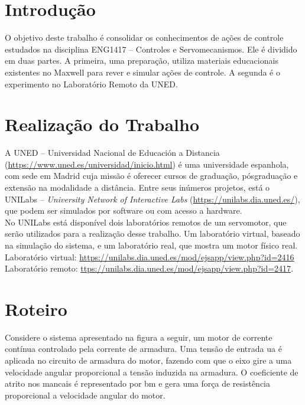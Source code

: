 \documentclass[a4paper, 12pt]{article}
\begin{document}


\newpage
\listoffigures

\pagebreak

\section{Introdução}
O objetivo deste trabalho é consolidar os conhecimentos de ações de controle estudados na disciplina ENG1417 – Controles e Servomecanismos. Ele é dividido em duas partes. A primeira, uma preparação, utiliza materiais educacionais existentes no Maxwell para rever e simular ações de controle. A segunda é o experimento no Laboratório Remoto da UNED.

\section{Realização do Trabalho}
A UNED – Universidad Nacional de Educación a Distancia (\url{https://www.uned.es/universidad/inicio.html}) é uma universidade espanhola, com sede em Madrid cuja missão é oferecer cursos de graduação, pósgraduação e extensão na modalidade a distância. Entre seus inúmeros projetos, está o UNILabs – \textit{University Network of Interactive Labs} (\url{https://unilabs.dia.uned.es/}), que podem ser simulados por software ou com acesso a hardware.\\

No UNILabs está disponível dois laboratórios remotos de um servomotor, que serão utilizados para a realização desse trabalho. Um laboratório virtual, baseado na simulação do sistema, e um laboratório real, que mostra um motor físico real.\\

Laboratório virtual: \url{https://unilabs.dia.uned.es/mod/ejsapp/view.php?id=2416} \\
Laboratório remoto: \url{ttps://unilabs.dia.uned.es/mod/ejsapp/view.php?id=2417}. 

\section{Roteiro}
Considere o sistema apresentado na figura a seguir, um motor de corrente contínua controlado pela corrente de armadura. Uma tensão de entrada ua é aplicada no circuito de armadura do motor, fazendo com que o eixo gire a uma velocidade angular proporcional a tensão induzida na armadura. O coeficiente de atrito nos mancais é representado por bm e gera uma força de resistência proporcional a velocidade angular do motor.
\end{document}
